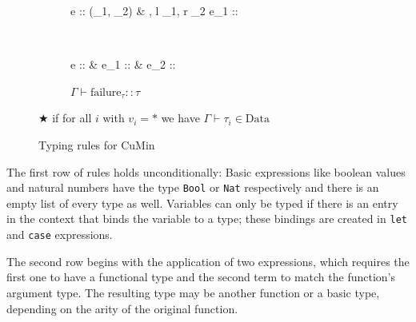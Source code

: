 \documentclass[paper = a4, fleqn, twoside]{scrreprt}
\begin{document}
\begin{figure}[H]
\begin{scriptsize}
\begin{center}
\begin{subfigure}[t]{.5 \linewidth}
			\end{subfigure}
			\hspace{.02 \linewidth}
			\begin{subfigure}[t]{.5 \linewidth}
				\centering
				{\Gamma \vdash e :: (\tau_{1}, \tau_{2}) & \Gamma, l \mapsto \tau_{1}, r \mapsto \tau_{2} \vdash e_{1} :: \tau}
			\end{subfigure}\\
			\vspace{1em}
			\begin{subfigure}[t]{.33 \linewidth}
				\centering
				{\Gamma \vdash e :: \:  & \Gamma \vdash e_{1} :: \tau & \Gamma \vdash e_{2} :: \tau}
			\end{subfigure}
			\begin{subfigure}[t]{.25 \linewidth}
				\centering
				$\Gamma \vdash \text{failure}_{\tau} :: \tau$
			\end{subfigure}
			\begin{subfigure}[t]{.33 \linewidth}
				\centering
			     	  {\Gamma \vdash \tau \in {}}
			\end{subfigure}
		\end{center}
			\begin{flushright}
				$\bigstar$ if for all $i$ with $v_{i} = *$ we have $\Gamma \vdash \tau_{i} \in \text{Data}$
			\end{flushright}
	\end{scriptsize}
	\vspace*{-1em}
	\caption{Typing rules for CuMin}
\end{figure}\noindent
The first row of rules holds unconditionally: Basic expressions like boolean values and natural numbers have the type \texttt{Bool} or \texttt{Nat} respectively and there is an empty list of every type as well. Variables can only be typed if there is an entry in the context that binds the variable to a type; these bindings are created in \texttt{let} and \texttt{case} expressions.
\par
The second row begins with the application of two expressions, which requires the first one to have a functional type and the second term to match the function's argument type. The resulting type may be another function or a basic type, depending on the arity of the original function.
\end{document}
